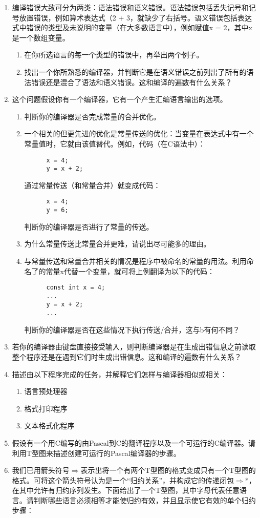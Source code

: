 \documentclass[lang=cn,10pt]{elegantbook}
\begin{document}
\begin{enumerate}
  \item 编译错误大致可分为两类：语法错误和语义错误。语法错误包括丢失记号和记号放置错误，例如算术表达式（2 + 3，就缺少了右括号。语义错误包括表达式中错误的类型及未说明的变量（在大多数语言中），例如赋值x = 2，其中x是一个数组变量。
  \begin{enumerate}
    \item 在你所选语言的每一个类型的错误中，再举出两个例子。
    \item 找出一个你所熟悉的编译器，并判断它是在语义错误之前列出了所有的语法错误还是混合了语法和语义错误。这和编译的遍数有什么关系？
  \end{enumerate}
  \item 这个问题假设你有一个编译器，它有一个产生汇编语言输出的选项。
  \begin{enumerate}
    \item 判断你的编译器是否完成常量的合并优化。
    \item 一个相关的但更先进的优化是常量传送的优化：当变量在表达式中有一个常量值时，它就由该值替代。例如，代码（在C语法中）：
    \begin{lstlisting}
      x = 4;
      y = x + 2;
    \end{lstlisting}
    通过常量传送（和常量合并）就变成代码：
    \begin{lstlisting}
      x = 4;
      y = 6;
    \end{lstlisting}
    判断你的编译器是否进行了常量的传送。
    \item 为什么常量传送比常量合并更难，请说出尽可能多的理由。
    \item 与常量传送和常量合并相关的情况是程序中被命名的常量的用法。利用命名了的常量x代替一个变量，就可将上例翻译为以下的代码：
    \begin{lstlisting}
      const int x = 4;
      ...
      y = x + 2;
      ...
    \end{lstlisting}
    判断你的编译器是否在这些情况下执行传送/合并，这与b有何不同？
  \end{enumerate}
  \item 若你的编译器由键盘直接接受输入，则判断编译器是在生成出错信息之前读取整个程序还是在遇到它们时生成出错信息。这和编译的遍数有什么关系？
  \item 描述由以下程序完成的任务，并解释它们怎样与编译器相似或相关：
  \begin{enumerate}
    \item 语言预处理器
    \item 格式打印程序
    \item 文本格式化程序
  \end{enumerate}
  \item 假设有一个用C编写的由Pascal到C的翻译程序以及一个可运行的C编译器。请利用T型图来描述创建可运行的Pascal编译器的步骤。
  \item 我们已用箭头符号$\Rightarrow$表示出将一个有两个T型图的格式变成只有一个T型图的格式。可将这个箭头符号认为是一个“归约关系”，并构成它的传递闭包$\Rightarrow$*，在其中允许有归约序列发生。下面给出了一个T型图，其中字母代表任意语言。请判断哪些语言必须相等才能使归约有效，并且显示使它有效的单个归约步骤：
  

\end{enumerate}
\end{document}
